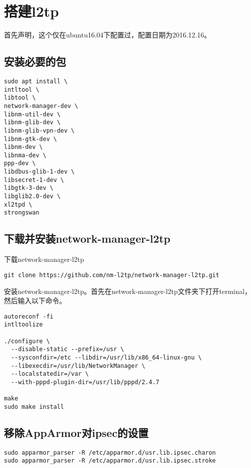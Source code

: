 \documentclass[a4paper,left=2.5cm,right=2.5cm,11pt]{article}
\begin{document}
\tableofcontents

\clearpage

\section{搭建l2tp}

首先声明，这个仅在ubuntu16.04下配置过，配置日期为2016.12.16。

\subsection{安装必要的包}
\begin{lstlisting}
sudo apt install \  
intltool \  
libtool \  
network-manager-dev \  
libnm-util-dev \  
libnm-glib-dev \  
libnm-glib-vpn-dev \  
libnm-gtk-dev \  
libnm-dev \  
libnma-dev \  
ppp-dev \  
libdbus-glib-1-dev \  
libsecret-1-dev \  
libgtk-3-dev \  
libglib2.0-dev \  
xl2tpd \  
strongswan  
\end{lstlisting}

\subsection{下载并安装network-manager-l2tp}
下载network-manager-l2tp
\begin{lstlisting}
git clone https://github.com/nm-l2tp/network-manager-l2tp.git    
\end{lstlisting}

安装network-manager-l2tp。首先在network-manager-l2tp文件夹下打开terminal，然后输入以下命令。
\begin{lstlisting}
autoreconf -fi  
intltoolize

./configure \
  --disable-static --prefix=/usr \
  --sysconfdir=/etc --libdir=/usr/lib/x86_64-linux-gnu \
  --libexecdir=/usr/lib/NetworkManager \
  --localstatedir=/var \
  --with-pppd-plugin-dir=/usr/lib/pppd/2.4.7

make  
sudo make install
\end{lstlisting}

\subsection{移除AppArmor对ipsec的设置}
\begin{lstlisting}
sudo apparmor_parser -R /etc/apparmor.d/usr.lib.ipsec.charon  
sudo apparmor_parser -R /etc/apparmor.d/usr.lib.ipsec.stroke 
\end{lstlisting}
\end{document}
